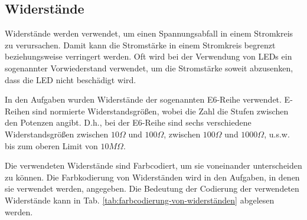 \newpage

\subsection{Widerstände}
\label{subsec:widerstände}

Widerstände werden verwendet, um einen Spannungsabfall in einem Stromkreis zu verursachen.
Damit kann die Stromstärke in einem Stromkreis begrenzt beziehungsweise verringert werden.
Oft wird bei der Verwendung von LEDs ein sogenannter Vorwiederstand verwendet, um die Stromstärke soweit abzusenken, dass die LED nicht beschädigt wird.

In den Aufgaben wurden Widerstände der sogenannten E6-Reihe verwendet.
E-Reihen sind normierte Widerstandsgrößen, wobei die Zahl die Stufen zwischen den Potenzen angibt.
D.h., bei der E6-Reihe sind sechs verschiedene Widerstandsgrößen zwischen $10\Omega$ und $100\Omega$, zwischen $100\Omega$ und $1000\Omega$, u.s.w. bis zum oberen Limit von $10M\Omega$.

Die verwendeten Widerstände sind Farbcodiert, um sie voneinander unterscheiden zu können.
Die Farbkodierung von Widerständen wird in den Aufgaben, in denen sie verwendet werden, angegeben.
Die Bedeutung der Codierung der verwendeten Widerstände kann in Tab. \ref{tab:farbcodierung-von-widerständen} abgelesen werden.

